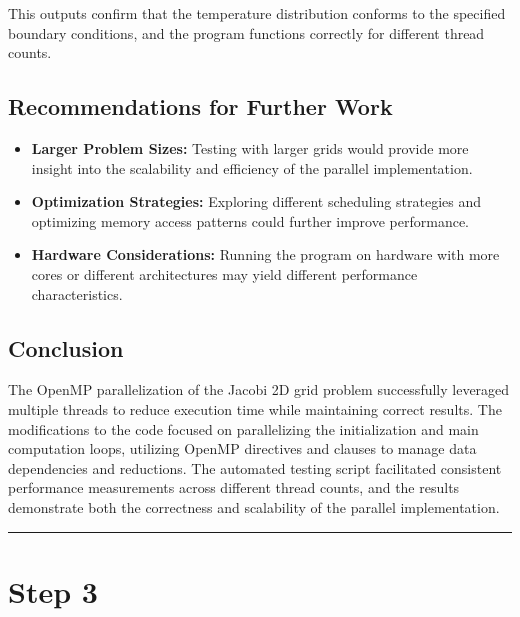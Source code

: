 \documentclass{article}
\begin{document}
This outputs confirm that the temperature distribution conforms to the specified boundary conditions, and the program functions correctly for different thread counts.

\subsection{Recommendations for Further Work}

\begin{itemize}
    \item \textbf{Larger Problem Sizes:} Testing with larger grids would provide more insight into the scalability and efficiency of the parallel implementation.
    \item \textbf{Optimization Strategies:} Exploring different scheduling strategies and optimizing memory access patterns could further improve performance.
    \item \textbf{Hardware Considerations:} Running the program on hardware with more cores or different architectures may yield different performance characteristics.
\end{itemize}

\subsection{Conclusion}

The OpenMP parallelization of the Jacobi 2D grid problem successfully leveraged multiple threads to reduce execution time while maintaining correct results. The modifications to the code focused on parallelizing the initialization and main computation loops, utilizing OpenMP directives and clauses to manage data dependencies and reductions. The automated testing script facilitated consistent performance measurements across different thread counts, and the results demonstrate both the correctness and scalability of the parallel implementation.

\rule{\linewidth}{0.5pt}

\section{Step 3}
\end{document}
